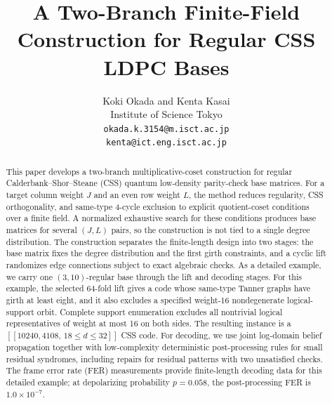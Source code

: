 \documentclass[11pt,a4paper]{article}
\title{A Two-Branch Finite-Field Construction for Regular CSS LDPC Bases}
\author{Koki Okada and Kenta Kasai\\Institute of Science Tokyo\\\texttt{okada.k.3154@m.isct.ac.jp}\\\texttt{kenta@ict.eng.isct.ac.jp}}
\date{}
\theoremstyle{uprighttheorem}
\begin{document}
\maketitle

\begin{abstract}
This paper develops a two-branch multiplicative-coset construction for regular Calderbank--Shor--Steane (CSS) quantum low-density parity-check base matrices.
For a target column weight \(J\) and an even row weight \(L\), the method reduces regularity, CSS orthogonality, and same-type 4-cycle exclusion to explicit quotient-coset conditions over a finite field.
A normalized exhaustive search for these conditions produces base matrices for several \((J,L)\) pairs, so the construction is not tied to a single degree distribution.
The construction separates the finite-length design into two stages: the base matrix fixes the degree distribution and the first girth constraints, and a cyclic lift randomizes edge connections subject to exact algebraic checks.
As a detailed example, we carry one \((3,10)\)-regular base through the lift and decoding stages.
For this example, the selected 64-fold lift gives a code whose same-type Tanner graphs have girth at least eight, and it also excludes a specified weight-16 nondegenerate logical-support orbit.
Complete support enumeration excludes all nontrivial logical representatives of weight at most 16 on both sides. The resulting instance is a \([[10240,4108,\,18\le d\le32]]\) CSS code.
For decoding, we use joint log-domain belief propagation together with low-complexity deterministic post-processing rules for small residual syndromes, including repairs for residual patterns with two unsatisfied checks.
The frame error rate (FER) measurements provide finite-length decoding data for this detailed example; at depolarizing probability \(p=0.058\), the post-processing FER is \(1.0\times10^{-7}\).
\end{abstract}
\end{document}
